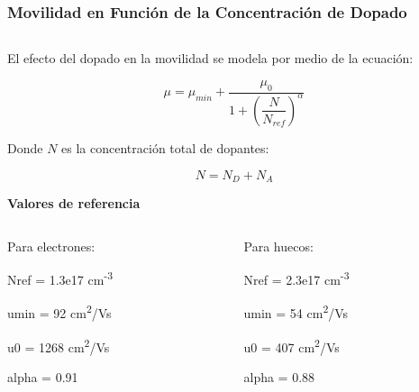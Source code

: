 \documentclass[10pt,t,aspectratio=169]{beamer}
\begin{document}
\begin{frame}[t]
    \frametitle{Movilidad en Función de la Concentración de Dopado}

    \begin{columns}
        \begin{column}{0.5\textwidth}
            El efecto del dopado en la movilidad se modela por medio de la ecuación:

            \[ \mu = \mu_{min} + \dfrac{\mu_0}{1 + \left( \dfrac{N}{N_{ref}} \right)^\alpha} \]

            Donde $N$ es la concentración total de dopantes:
            
            \[N = N_D + N_A\]

            \vspace{3mm}
            \centering
            \textbf{Valores de referencia}

            \begin{columns}
            
                \begin{column}{0.5\textwidth}
                
                    Para electrones:

                    \vspace{2mm}
                    Nref = 1.3e17 cm\textsuperscript{-3}

                    umin = 92 cm\textsuperscript{2}/Vs
                    
                    u0 = 1268 cm\textsuperscript{2}/Vs
                    
                    alpha = 0.91
                    
                \end{column}
                
                \begin{column}{0.5\textwidth}
                
                    Para huecos:

                    \vspace{2mm}
                    Nref = 2.3e17 cm\textsuperscript{-3}

                    umin = 54 cm\textsuperscript{2}/Vs
                    
                    u0 = 407 cm\textsuperscript{2}/Vs
                    
                    alpha = 0.88
                    

\end{column}
\end{columns}
\end{column}
\end{columns}
\end{frame}
\end{document}
